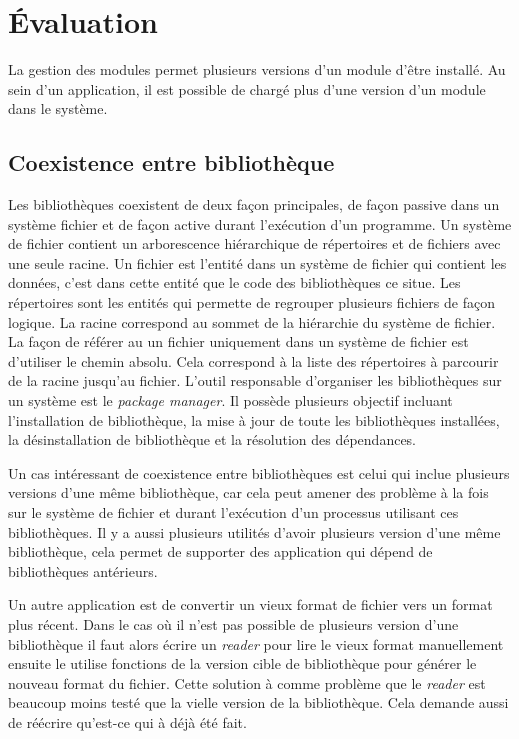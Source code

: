 \chapter{Évaluation}
La gestion des modules permet plusieurs versions d'un
module d'être installé. Au sein d'un application, il
est possible de chargé plus d'une version d'un module
dans le système.

\section{Coexistence entre bibliothèque}
Les bibliothèques coexistent de deux façon principales, de façon passive dans
un système fichier et de façon active durant l'exécution d'un programme.  Un
système de fichier contient un arborescence hiérarchique de répertoires et de
fichiers avec une seule racine. Un fichier est l'entité dans un système de
fichier qui contient les données, c'est dans cette entité que le code des
bibliothèques ce situe.  Les répertoires sont les entités qui permette de
regrouper plusieurs fichiers de façon logique. La racine correspond au sommet
de la hiérarchie du système de fichier. La façon de référer au un fichier
uniquement dans un système de fichier est d'utiliser le chemin absolu. Cela
correspond à la liste des répertoires à parcourir de la racine jusqu'au
fichier. L'outil responsable d'organiser les bibliothèques sur un système
est le \textit{package manager}. Il possède plusieurs objectif incluant
l'installation de bibliothèque, la mise à jour de toute les bibliothèques
installées, la désinstallation de bibliothèque et la résolution des dépendances.

Un cas intéressant de coexistence entre bibliothèques est celui qui inclue
plusieurs versions d'une même bibliothèque, car cela peut amener des problème
à la fois sur le système de fichier et durant l'exécution d'un processus utilisant
ces bibliothèques. Il y a aussi plusieurs utilités d'avoir plusieurs version
d'une même bibliothèque, cela permet de supporter des application qui dépend de
bibliothèques antérieurs.

Un autre application est de convertir un vieux format de fichier vers un format
plus récent. Dans le cas où il n'est pas possible de plusieurs version d'une bibliothèque
il faut alors écrire un \textit{reader} pour lire le vieux format manuellement ensuite le
utilise fonctions de la version cible de bibliothèque pour générer le nouveau format du fichier.
Cette solution à comme problème que le \textit{reader} est beaucoup moins testé que la
vielle version de la bibliothèque. Cela demande aussi de réécrire qu'est-ce qui à déjà été fait.

